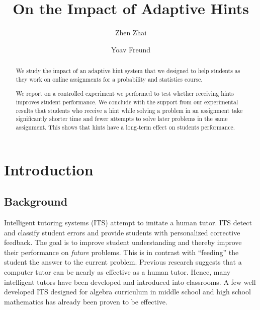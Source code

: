 \documentclass{llncs2e/llncs}
\title{On the Impact of Adaptive Hints}
\author{Zhen Zhai\inst{1} \and Yoav Freund\inst{2}}
\institute{UC San Diego \email{zzhai@eng.ucsd.edu} \and UC San Diego \email{yfreund@eng.ucsd.edu}}
\begin{document}
\maketitle

\begin{abstract}

We study the impact of an adaptive hint system that we designed to help students as they work on online assignments for a
probability and statistics course.

We report on a controlled experiment we performed to test whether receiving hints improves student performance. We conclude with the support from our experimental results that students who receive a hint while solving a problem in an assignment take significantly shorter time and fewer attempts to solve later problems in the same assignment. This shows that hints have a long-term effect on students performance.

\end{abstract}



\section{Introduction}



\subsection*{Background}
Intelligent tutoring systems (ITS)\cite{Anderson1995} attempt to imitate a human tutor.  ITS detect and classify student errors and
provide students with personalized corrective feedback. The goal is to improve student understanding and thereby improve their performance on {\em future} problems. This is in contrast with ``feeding'' the student the answer to the current problem. Previous research suggests that a computer tutor can be nearly as effective as a human tutor\cite{Vanlehn2011}. Hence, many intelligent tutors have been developed and introduced into classrooms. A few well developed ITS designed for algebra curriculum in middle school and high school mathematics has already been proven to be effective\cite{Koedinger1997,John2014}.
\end{document}

